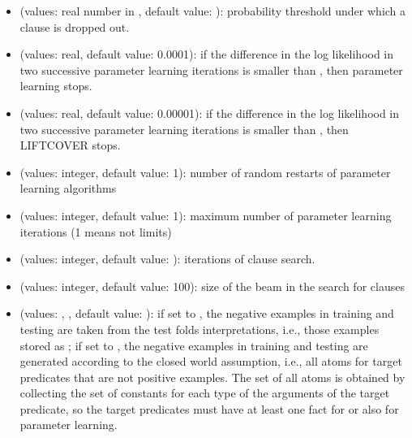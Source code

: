\documentclass[letterpaper,10pt,english]{sphinxmanual}
\begin{document}
\begin{itemize}
\begin{itemize}
\item {} 
\sphinxAtStartPar
{} (values: real number in \sphinxcode{\sphinxupquote{{[}0,1{]}}}, default value: ):  probability threshold under which a clause is dropped out.

\item {} 
\sphinxAtStartPar
{} (values: real, default value: 0.0001): if the difference in the log likelihood in two successive parameter learning iterations is smaller than , then parameter learning stops.

\item {} 
\sphinxAtStartPar
{} (values: real, default value: 0.00001): if the difference in the log likelihood in two successive parameter learning iterations is smaller than , then LIFTCOVER stops.

\item {} 
\sphinxAtStartPar
{} (values: integer, default value: 1): number of random restarts of parameter learning algorithms

\item {} 
\sphinxAtStartPar
{} (values: integer, default value: \sphinxhyphen{}1): maximum number of parameter learning iterations (\sphinxhyphen{}1 means not limits)

\item {} 
\sphinxAtStartPar
{} (values: integer, default value: ): iterations of clause search.

\item {} 
\sphinxAtStartPar
{} (values: integer, default value: 100): size of the beam in the search for clauses

\item {} 
\sphinxAtStartPar
{} (values: , , default value: ): if set to , the negative examples in training and testing are taken from the test folds interpretations, i.e., those examples  stored as ; if set to , the negative examples in training and testing are generated according to the closed world assumption, i.e., all atoms for target predicates that are not positive examples. The set of all atoms is obtained by collecting the set of constants for each type of the arguments of the target predicate, so the target predicates must have at least one fact for  or  also for parameter learning.


\end{itemize}
\end{itemize}
\end{document}
